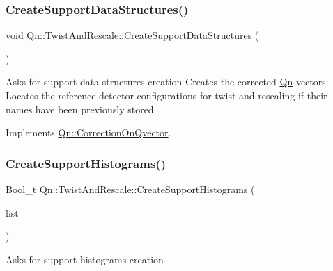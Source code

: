 \mbox{\label{classQn_1_1TwistAndRescale_af28bb42098c1b3138769d1747f06468f}} 
\subsubsection{\texorpdfstring{Create\+Support\+Data\+Structures()}{CreateSupportDataStructures()}}
{\footnotesize\ttfamily void Qn\+::\+Twist\+And\+Rescale\+::\+Create\+Support\+Data\+Structures (\begin{DoxyParamCaption}{ }\end{DoxyParamCaption})\hspace{0.3cm}{\ttfamily [virtual]}}

Asks for support data structures creation Creates the corrected \mbox{\hyperlink{namespaceQn}{Qn}} vectors Locates the reference detector configurations for twist and rescaling if their names have been previously stored 

Implements \mbox{\hyperlink{classQn_1_1CorrectionOnQvector_ac7c019bc36ac90618ed6e5fc768ca593}{Qn\+::\+Correction\+On\+Qvector}}.

\mbox{\label{classQn_1_1TwistAndRescale_a57826092f0c09750fe0f5919e2cdb617}} 
\subsubsection{\texorpdfstring{Create\+Support\+Histograms()}{CreateSupportHistograms()}}
{\footnotesize\ttfamily Bool\+\_\+t Qn\+::\+Twist\+And\+Rescale\+::\+Create\+Support\+Histograms (\begin{DoxyParamCaption}\item[{T\+List $\ast$}]{list }\end{DoxyParamCaption})\hspace{0.3cm}{\ttfamily [virtual]}}

Asks for support histograms creation

